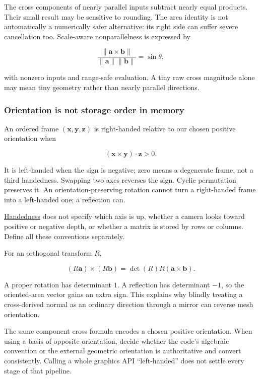 The cross components of nearly parallel inputs subtract nearly equal products. Their small result may be sensitive to rounding. The area identity is not automatically a numerically safer alternative: its right side can suffer severe cancellation too. Scale-aware nonparallelness is expressed by

\[
\frac{\|\mathbf a\times\mathbf b\|}{\|\mathbf a\|\|\mathbf b\|}=\sin\theta,
\]

with nonzero inputs and range-safe evaluation. A tiny raw cross magnitude alone may mean tiny geometry rather than nearly parallel directions.

\subsubsection{Orientation is not storage order in memory}\label{01-foundations-i-ch017-orientation-is-not-storage-order-in-memory}

\hypertarget{01-foundations-i-ch017-orientation-is-not-storage-order-in-memory}{}

An ordered frame \((\mathbf x,\mathbf y,\mathbf z)\) is right-handed relative to our chosen positive orientation when

\[
(\mathbf x\times\mathbf y)\cdot\mathbf z>0.
\]

It is left-handed when the sign is negative; zero means a degenerate frame, not a third handedness. Swapping two axes reverses the sign. Cyclic permutation preserves it. An orientation-preserving rotation cannot turn a right-handed frame into a left-handed one; a reflection can.

\hyperref[01-foundations-i-ch017-oriented-area-tells-us-which-side-of-the-panel-is-front]{Handedness} does not specify which axis is up, whether a camera looks toward positive or negative depth, or whether a matrix is stored by rows or columns. Define all these conventions separately.

For an orthogonal transform \(R\),

\[
(R\mathbf a)\times(R\mathbf b)
=\det(R)R(\mathbf a\times\mathbf b).
\]

A proper rotation has determinant \(1\). A reflection has determinant \(-1\), so the oriented-area vector gains an extra sign. This explains why blindly treating a cross-derived normal as an ordinary direction through a mirror can reverse mesh orientation.

The same component cross formula encodes a chosen positive orientation. When using a basis of opposite orientation, decide whether the code's algebraic convention or the external geometric orientation is authoritative and convert consistently. Calling a whole graphics API ``left-handed'' does not settle every stage of that pipeline.

